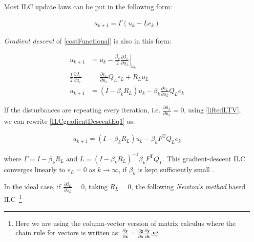 \documentclass[10pt,a4paper]{article}
\newcommand\at[2]{\left.#1\right|_{#2}} %
\newcommand{\error}{e} %
\newcommand{\linDist}{d} %
\newcommand{\sysInput}{u} %
\newcommand{\qmatrix}{\Gamma} %
\newcommand{\lmatrix}{L} %
\newcommand{\ValueFunction}{J}
\begin{document}
Most ILC update laws can be put in the following form:

\begin{equation}
\begin{aligned}
\sysInput_{k+1} = \qmatrix(\sysInput_{k} - \lmatrix\error_{k})
\end{aligned}
\label{ILCupdateForm}
\end{equation}

\emph{Gradient descent} of \eqref{costFunctional} is also in this form:

\begin{equation}
\begin{aligned}
\sysInput_{k+1} &= \sysInput_k - \frac{\beta_k}{2} \at{\frac{\partial{\ValueFunction_L}}{\partial{\sysInput_L}}}{\sysInput_k} \\
\frac{1}{2}\frac{\partial{\ValueFunction_L}}{\partial{\sysInput_L}} &= \frac{\partial{\error_L}}{\partial{\sysInput_L}}Q_L\error_L + R_L\sysInput_L \\
\sysInput_{k+1} &= (I - \beta_kR_L)\sysInput_k - \beta_k\frac{\partial{\error_L}}{\partial{\sysInput_L}}Q_L\error_k
\end{aligned}
\label{ILCgradientDescentEq1}
\end{equation}

If the disturbances are repeating every iteration, i.e. $\frac{\partial{\linDist_L}}{\partial{\sysInput_L}} = 0$, using \eqref{liftedLTV}, we can rewrite \eqref{ILCgradientDescentEq1} as:

\begin{equation}
\begin{aligned}
\sysInput_{k+1} = (I - \beta_kR_L)\sysInput_k - \beta_kF^\mathrm{T}Q_L\error_k
\end{aligned}
\label{ILCgradientDescentEq2}
\end{equation}

where $\qmatrix = I - \beta_kR_L$ and $\lmatrix = (I - \beta_kR_L)^{-1}\beta_kF^\mathrm{T}Q_L$. This gradient-descent ILC converges linearly to $\error_L = 0$ as $k \to \infty$, if $\beta_k$ is kept sufficiently small \cite{Nocedal99}.

In the ideal case, if $\frac{\partial{\linDist_L}}{\partial{\sysInput_L}} = 0$, taking $R_L = 0$, the following \emph{Newton's method} based ILC~\footnote{Here we are using the column-vector version of matrix calculus where the chain rule for vectors is written as: $\frac{\partial\mathbf{y}}{\partial\mathbf{x}} = \frac{\partial\mathbf{z}}{\partial\mathbf{x}}\frac{\partial\mathbf{y}}{\partial\mathbf{z}}$.}
\end{document}
